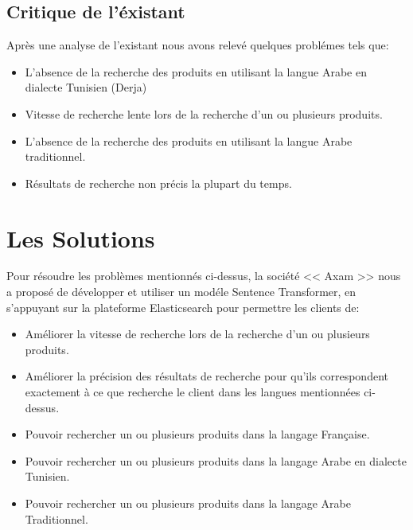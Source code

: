 \subsection{Critique de l'éxistant}
\noindent
Après une analyse de l'existant nous avons relevé quelques problémes tels que:

\renewcommand\labelitemi{$\bullet$}
\begin{itemize}
    \item L'absence de la recherche des produits en utilisant la langue Arabe en dialecte Tunisien (Derja) 
    \item Vitesse de recherche lente lors de la recherche d'un ou plusieurs produits.
    \item L'absence de la recherche des produits en utilisant la langue Arabe traditionnel.
    \item Résultats de recherche non précis la plupart du temps.
\end{itemize}

\newpage
\section{Les Solutions}
\noindent
Pour résoudre les problèmes mentionnés ci-dessus, la société << Axam >> nous a proposé de développer et utiliser un modéle Sentence Transformer, en s'appuyant sur la plateforme Elasticsearch pour permettre les clients de:

\renewcommand\labelitemi{$\bullet$}
\begin{itemize}
    \item Améliorer la vitesse de recherche lors de la recherche d’un ou plusieurs produits.

    \item Améliorer la précision des résultats de recherche pour qu'ils correspondent exactement à ce que recherche le client dans les langues mentionnées ci-dessus.

    \item Pouvoir rechercher un ou plusieurs produits dans la langage Française.

    \item Pouvoir rechercher un ou plusieurs produits dans la langage Arabe en dialecte Tunisien.

    \item Pouvoir rechercher un ou plusieurs produits dans la langage Arabe Traditionnel.
\end{itemize}